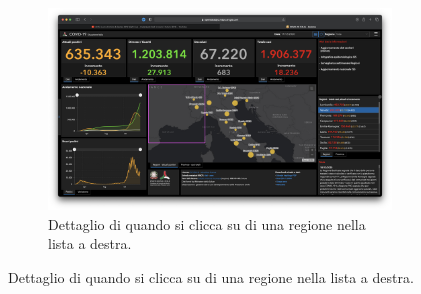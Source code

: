 \begin{enumerate}
\begin{figure}[H]
            \begin{subfigure}[b]{0.5\columnwidth}
                \includegraphics[width=\columnwidth]{../../../assets/images/verifica-risorse-esistenti/guidelines_violations_12}
                \caption{Dettaglio di quando si clicca su di una regione nella lista a destra.}
            \end{subfigure}


\end{figure}
\end{enumerate}
